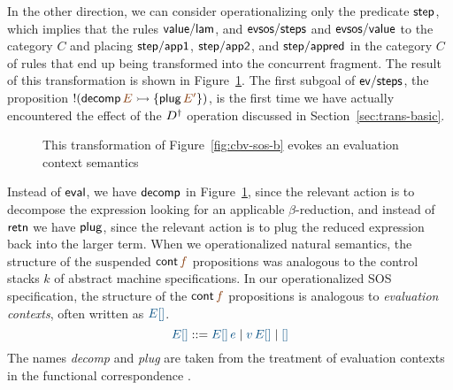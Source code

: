 In the other direction, we can consider operationalizing only the
predicate ${\sf step}$, which implies that the rules ${\sf
  value/lam}$, and ${\sf evsos/steps}$ and ${\sf evsos/value}$ to the
category $C$ and placing ${\sf step/app1}$, ${\sf step/app2}$, and
${\sf step/appred}$ in the category $C$ of rules that end up being
transformed into the concurrent fragment.  The result of this
transformation is shown in Figure~\ref{fig:cbv-sos}. The
first subgoal of ${\sf ev/steps}$, the proposition ${!}({\sf
  decomp}\,\lf{E} \lefti \{ {\sf plug}\,\lf{E'} \})$, is the first
time we have actually encountered the effect of the ${{D}^\dag}$
operation discussed in Section~\ref{sec:trans-basic}.

\begin{figure}[tp]
\begin{minipage}[b]{0.9\linewidth}
\end{minipage}
\caption{This transformation of Figure~\ref{fig:cbv-sos-b} evokes an
  evaluation context semantics}
\label{fig:cbv-sos}
\end{figure}


Instead of ${\sf eval}$, we
have ${\sf decomp}$ in Figure~\ref{fig:cbv-sos}, since the relevant
action is to decompose the expression looking for an applicable
$\beta$-reduction, and instead of ${\sf retn}$ we have ${\sf plug}$,
since the relevant action is to plug the reduced expression back into
the larger term.  When we operationalized natural semantics, the
structure of the suspended ${\sf cont}\,\lf{f}$ propositions was
analogous to the control stacks $k$ of abstract machine
specifications. In our operationalized SOS specification, the
structure of the ${\sf cont}\,\lf{f}$ propositions is analogous to
{\it evaluation contexts}, often written as $\obj{E[]}$.
\[
\obj{E[]} ::= \obj{E[]\,e} \mid \obj{v\,E[]} \mid \obj{[]}
\]
The names {\it decomp} and {\it plug} are taken from the treatment
of evaluation contexts in the functional correspondence
\cite{danvy08defunctionalized}.





